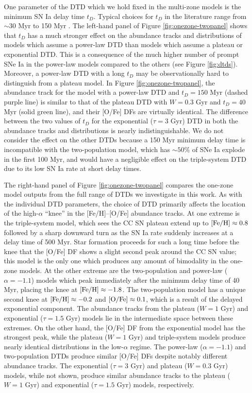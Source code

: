 \documentclass[twocolumn,twocolappendix,linenumbers,trackchanges]{aastex631}
\begin{document}
One parameter of the DTD which we hold fixed in the multi-zone models is the minimum SN Ia delay time $t_D$. Typical choices for $t_D$ in the literature range from $\sim 30$ Myr \citep[e.g.,][]{Poulhazan2018-PrecisionPollution} to 150 Myr . The left-hand panel of Figure \ref{fig:onezone-twopanel} shows that $t_D$ has a much stronger effect on the abundance tracks and distributions of models which assume a power-law DTD than models which assume a plateau or exponential DTD. This is a consequence of the much higher number of prompt SNe Ia in the power-law models compared to the others (see Figure \ref{fig:dtds}). Moreover, a power-law DTD with a long $t_D$ may be observationally hard to distinguish from a plateau model. In Figure \ref{fig:onezone-twopanel}, the abundance track for the model with a power-law DTD and $t_D=150$ Myr (dashed purple line) is similar to that of the plateau DTD with $W=0.3$ Gyr and $t_D=40$ Myr (solid green line), and their [O/Fe] DFs are virtually identical. The difference between the two values of $t_D$ for the exponential ($\tau=3$ Gyr) DTD in both the abundance tracks and distributions is nearly indistinguishable. We do not consider the effect on the other DTDs because a 150 Myr minimum delay time is incompatible with the two-population model, which has $\sim 50$\% of SNe Ia explode in the first 100 Myr, and would have a negligible effect on the triple-system DTD due to its low SN Ia rate at short delay times.

The right-hand panel of Figure \ref{fig:onezone-twopanel} compares the one-zone model outputs from the full range of DTDs we investigate in this work. As with the individual DTD parameters, the choice of DTD primarily affects the location of the high-$\alpha$ ``knee'' in the [Fe/H]--[O/Fe] abundance tracks. At one extreme is the triple-system model, which sees the CC SN plateau extend up to ${\rm [Fe/H]}\approx0.8$ followed by a sharp downward turn as the SN Ia rate suddenly increases at a delay time of 500 Myr. Star formation proceeds for such a long time before the knee that the [O/Fe] DF shows a slight second peak around the CC SN value; this model is the only one which produces any amount of bimodality in the one-zone models. At the other extreme are the two-population and power-law ($\alpha=-1.1$) models which peak immediately after the minimum delay time of 40 Myr, placing the knee at ${\rm [Fe/H]}\approx-1.8$. The two-population model has a unique second knee at ${\rm [Fe/H]}\approx-0.2$ and ${\rm [O/Fe]}\approx0.1$, which is a result of the delayed exponential component. The abundance tracks from the plateau ($W=1$ Gyr) and exponential ($\tau=1.5$ Gyr) models lie in the intermediate space between these extremes. On the other hand, the [O/Fe] DF from the exponential model has the strongest peak, while the plateau ($W=1$ Gyr) and triple-system models produce nearly identical distributions in the low-$\alpha$ regime. The power-law ($\alpha=-1.1$) and two-population DTDs produce similar [O/Fe] DFs despite notably different abundance tracks. The exponential ($\tau=3$ Gyr) and plateau ($W=0.3$ Gyr) models, while not shown, produce similar abundance tracks to the plateau ($W=1$ Gyr) and exponential ($\tau=1.5$ Gyr) models, respectively.
\end{document}
